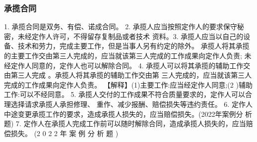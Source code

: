 \documentclass[UTF8,12pt]{ctexart}
\numberwithin{equation}{section} %
\numberwithin{figure}{section}
\numberwithin{table}{section}
\begin{document}
	
	\subsubsection{承揽合同}
	
	
	1. 承揽合同是双务、有偿、诺成合同。
	2. 承揽人应当按照定作人的要求保守秘密，未经定作人许可，不得留存复制品或者技术 资料。3. 承揽人应当以自己的设备、技术和劳力，完成主要工作，但是当事人另有约定的除外。 承揽人将其承揽的主要工作交由第三人完成的，应当就该第三人完成的工作成果向定作人负责; 未经定作人同意的，定作人也可以解除合同。
	4. 承揽人可以将其承揽的辅助工作交由第三人完成 。承揽人将其承揽的辅助工作交由第 三人完成的，应当就该第三人完成的工作成果向定作人负责。
	【解释】(1)主要工作:应当经定作人同意;(2 )辅助工作:可以不经同意。
	5. 承揽人交付的工作成果不符合质量要求的，定作人可以合理选择请求承揽人承担修理、 重作、减少报酬、赔偿损失等违约责任。
	6. 定作人中途变更承揽工作的要求，造成承揽人损失的，应当赔偿损失。(2022年案例分 析题)
	7. 定作人在承揽人完成工作前可以随时解除合同，造成承揽人损失的，应当赔偿损失。 (2 0 2 2 年 案 例 分 析 题 )
	
	
\end{document}
